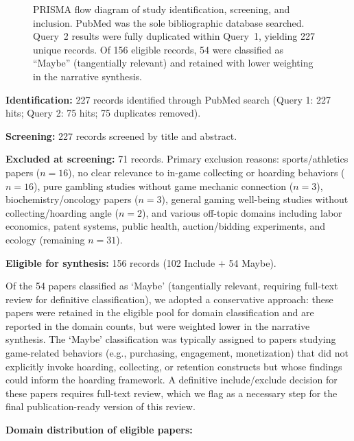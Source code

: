 \documentclass[12pt]{article}
\begin{document}
\begin{figure}[htbp]
\caption{PRISMA flow diagram of study identification, screening, and inclusion. PubMed was the sole bibliographic database searched. Query~2 results were fully duplicated within Query~1, yielding 227 unique records. Of 156 eligible records, 54 were classified as ``Maybe'' (tangentially relevant) and retained with lower weighting in the narrative synthesis.}
\label{fig:prisma}
\end{figure}

\textbf{Identification:} 227 records identified through PubMed search (Query 1: 227 hits; Query 2: 75 hits; 75 duplicates removed).

\textbf{Screening:} 227 records screened by title and abstract.

\textbf{Excluded at screening:} 71 records. Primary exclusion reasons: sports/athletics papers ($n = 16$), no clear relevance to in-game collecting or hoarding behaviors ($n = 16$), pure gambling studies without game mechanic connection ($n = 3$), biochemistry/oncology papers ($n = 3$), general gaming well-being studies without collecting/hoarding angle ($n = 2$), and various off-topic domains including labor economics, patent systems, public health, auction/bidding experiments, and ecology (remaining $n = 31$).

\textbf{Eligible for synthesis:} 156 records (102 Include $+$ 54 Maybe).

Of the 54 papers classified as `Maybe' (tangentially relevant, requiring full-text review for definitive classification), we adopted a conservative approach: these papers were retained in the eligible pool for domain classification and are reported in the domain counts, but were weighted lower in the narrative synthesis. The `Maybe' classification was typically assigned to papers studying game-related behaviors (e.g., purchasing, engagement, monetization) that did not explicitly invoke hoarding, collecting, or retention constructs but whose findings could inform the hoarding framework. A definitive include/exclude decision for these papers requires full-text review, which we flag as a necessary step for the final publication-ready version of this review.

\textbf{Domain distribution of eligible papers:}
\end{document}
